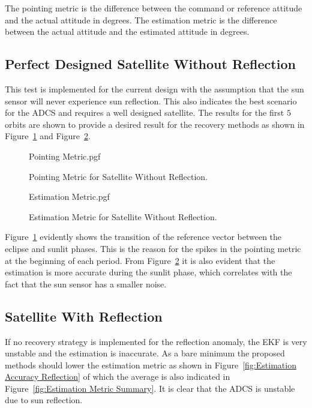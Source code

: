 \documentclass[letterpaper, 10 pt, conference]{ieeeconf}  %
\begin{document}
The pointing metric is the difference between the command or reference attitude and the actual attitude in degrees. The estimation metric is the difference between the actual attitude and the estimated attitude in degrees.

\subsection{Perfect Designed Satellite Without Reflection}
This test is implemented for the current design with the assumption that the sun sensor will never experience sun reflection. This also indicates the best scenario for the ADCS and requires a well designed satellite. The results for the first $5$ orbits are shown to provide a desired result for the recovery methods as shown in Figure~\ref{fig:Pointing Accuracy None} and Figure~\ref{fig:Estimation Accuracy None}. 
\begin{figure}[!htb]
	\begin{center}
		{Pointing Metric.pgf}
	\end{center}
	\caption[Pointing Metric for Satellite Without Reflection]{Pointing Metric for Satellite Without Reflection.}
	\label{fig:Pointing Accuracy None}
\end{figure}

\begin{figure}[!htb]
	\begin{center}
	{Estimation Metric.pgf}
	\end{center}
	\caption[Estimation Metric for Satellite Without Reflection]{Estimation Metric for Satellite Without Reflection.}
	\label{fig:Estimation Accuracy None}
\end{figure}

Figure~\ref{fig:Pointing Accuracy None} evidently shows the transition of the reference vector between the eclipse and sunlit phases. This is the reason for the spikes in the pointing metric at the beginning of each period. From Figure~\ref{fig:Estimation Accuracy None} it is also evident that the estimation is more accurate during the sunlit phase, which correlates with the fact that the sun sensor has a smaller noise.

\subsection{Satellite With Reflection}
If no recovery strategy is implemented for the reflection anomaly, the EKF is very unstable and the estimation is inaccurate. As a bare minimum the proposed methods should lower the estimation metric as shown in Figure~\ref{fig:Estimation Accuracy Reflection} of which the average is also indicated in Figure~\ref{fig:Estimation Metric Summary}. It is clear that the ADCS is unstable due to sun reflection.
\end{document}
